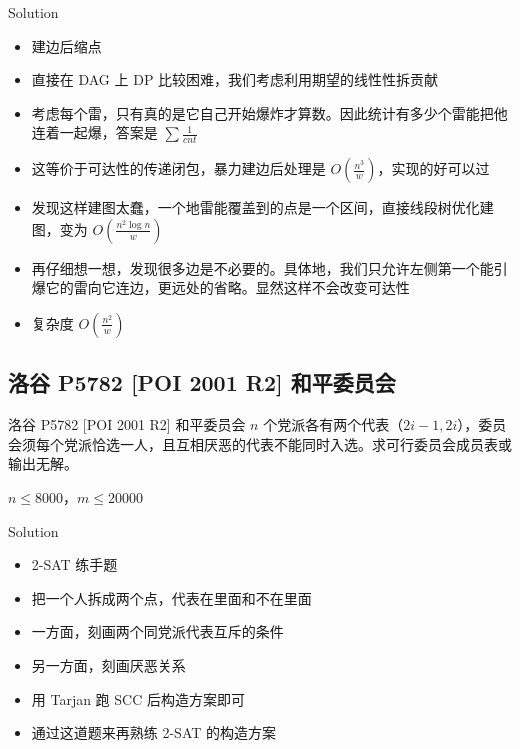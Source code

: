 ﻿\documentclass[aspectratio=169]{ctexbeamer}
\begin{document}
\begin{frame}{Solution}
    \begin{itemize}
        \item 建边后缩点
        \item 直接在 DAG 上 DP 比较困难，我们考虑利用期望的线性性拆贡献
        \item 考虑每个雷，只有真的是它自己开始爆炸才算数。因此统计有多少个雷能把他连着一起爆，答案是 $\sum \frac{1}{cnt}$
        \item 这等价于可达性的传递闭包，暴力建边后处理是 $O\left(\frac{n^3}{w}\right)$，实现的好可以过
        \item 发现这样建图太蠢，一个地雷能覆盖到的点是一个区间，直接线段树优化建图，变为 $O\left(\frac{n^2\log n}{w}\right)$
        \item 再仔细想一想，发现很多边是不必要的。具体地，我们只允许左侧第一个能引爆它的雷向它连边，更远处的省略。显然这样不会改变可达性
        \item 复杂度 $O\left(\frac{n^2}{w}\right)$
    \end{itemize}    
\end{frame}







\subsection{洛谷 P5782 [POI 2001 R2] 和平委员会}

\begin{frame}{洛谷 P5782 [POI 2001 R2] 和平委员会}
      $n$ 个党派各有两个代表（$2i-1,2i$），委员会须每个党派恰选一人，且互相厌恶的代表不能同时入选。求可行委员会成员表或输出无解。
      
      $n\le 8000$，$m\le 20000$
\end{frame}

\begin{frame}{Solution}
    \begin{itemize}
        \item 2-SAT 练手题
        \item 把一个人拆成两个点，代表在里面和不在里面
        \item 一方面，刻画两个同党派代表互斥的条件
        \item 另一方面，刻画厌恶关系
        \item 用 Tarjan 跑 SCC 后构造方案即可
        \item 通过这道题来再熟练 2-SAT 的构造方案
    \end{itemize}    
\end{frame}
\end{document}
